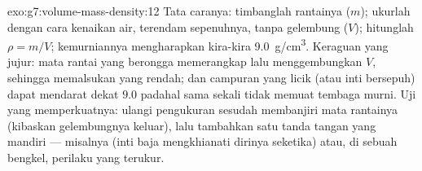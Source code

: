 \begin{solution}{exo:g7:volume-mass-density:12}
Tata caranya: timbanglah rantainya ($m$); ukurlah  dengan
cara kenaikan air, terendam sepenuhnya, tanpa gelembung ($V$);
hitunglah $\rho = m/V$; kemurniannya mengharapkan kira-kira
\qty{9.0}{g/cm^3}. Keraguan yang jujur: mata rantai yang berongga
memerangkap  lalu menggembungkan $V$, sehingga memalsukan  yang rendah; dan campuran yang licik (atau inti bersepuh) dapat
mendarat dekat $9.0$ padahal sama sekali tidak memuat tembaga murni.
Uji yang memperkuatnya: ulangi pengukuran  sesudah membanjiri
mata rantainya (kibaskan gelembungnya keluar), lalu tambahkan satu
tanda tangan yang mandiri --- misalnya  (inti baja mengkhianati
dirinya seketika) atau, di sebuah bengkel, perilaku  yang
terukur.
\end{solution}

